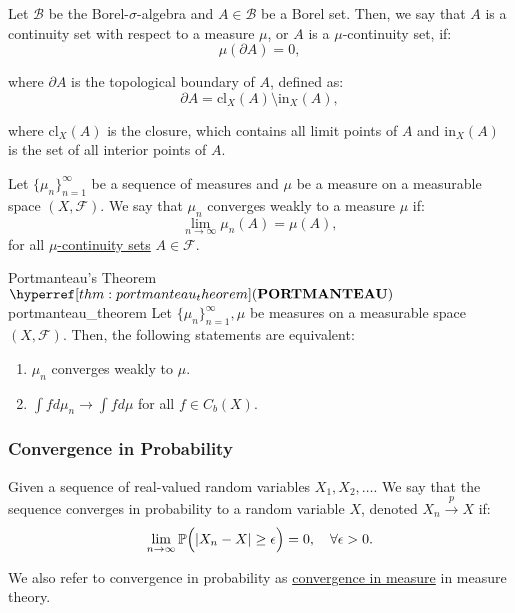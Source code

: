 \begin{definition} 
    Let $\mathcal{B}$ be the Borel-$\sigma$-algebra and $A\in \mathcal{B}$ be a Borel set. Then, we say that $A$ is a continuity set with respect to a measure $\mu$, or $A$ is a $\mu$-continuity set, if:
    \begin{equation}
        \mu(\partial A) = 0, 
    \end{equation} 

    \noindent where $\partial A$ is the topological boundary of $A$, defined as:
    \begin{equation}
        \partial A = \mathrm{cl}_X(A) \setminus \mathrm{in}_X(A),
    \end{equation} 

    \noindent where $\mathrm{cl}_X(A)$ is the closure, which contains all limit points of $A$ and $\mathrm{in}_X(A)$ is the set of all interior points of $A$.
\end{definition} 

\begin{definition}
    Let $\{\mu_n\}_{n=1}^\infty$ be a sequence of measures and $\mu$ be a measure on a measurable space $(X, \mathcal{F})$. We say that $\mu_n$ converges weakly to a measure $\mu$ if:
    \begin{equation}
        \lim_{n\to\infty}\mu_n(A) = \mu(A),
    \end{equation} 
    \noindent for all \underline{$\mu$-continuity sets} $A\in\mathcal{F}$.
\end{definition} 


\begin{theorem}{Portmanteau's Theorem $\PORT$}{portmanteau_theorem}
    Let $\{\mu_n\}_{n=1}^\infty, \mu$ be measures on a measurable space $(X, \mathcal{F})$. Then, the following statements are equivalent:
    \begin{enumerate}
        \item $\mu_n$ converges weakly to $\mu$.
        \item $\int fd\mu_n \to \int fd\mu$ for all $f\in C_b(X)$.     
    \end{enumerate}  
\end{theorem} 

\subsubsection{Convergence in Probability}
\begin{definition}
    Given a sequence of real-valued random variables $X_1, X_2, \dots$. We say that the sequence converges in probability to a random variable $X$, denoted $X_n\xrightarrow{p}X$ if:
    \begin{equation}
        \lim_{n\to\infty} \mathbb{P}\Big( |X_n - X| \ge \epsilon \Big) = 0, \quad \forall \epsilon > 0.
    \end{equation}

    \noindent We also refer to convergence in probability as \underline{convergence in measure} in measure theory.
\end{definition}

